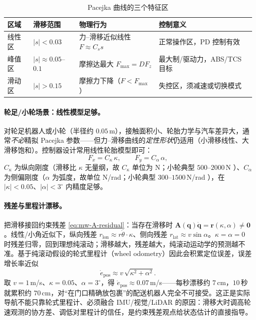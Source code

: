 \begin{table}[H]\centering\small
\caption{Pacejka 曲线的三个特征区}
\begin{tabular}{llll}
\toprule
区域 & 滑移范围 & 物理行为 & 控制意义 \\
\midrule
线性区 & $|s|<0.03$ & 力--滑移近似线性 $F\approx C_s s$ & 正常操作区，PD 控制有效 \\
峰值区 & $|s|\approx0.05$–$0.1$ & 摩擦达最大 $F_{\max}=DF_z$ & 最大制/驱动力，ABS/TCS 目标 \\
滑动区 & $|s|>0.15$ & 摩擦力下降（$F<F_{\max}$） & 失控区，须减速或切换模式 \\
\bottomrule
\end{tabular}
\end{table}

\paragraph{轮足/小轮场景：线性模型足够。}
对轮足机器人或小轮（半径约 $0.05$\,m），接触面积小、轮胎力学与汽车差异大，通常\emph{不必}精拟 Pacejka 参数——但力--滑移曲线的\emph{定性形状}仍适用（小滑移线性、大滑移饱和）。控制器设计常用线性轮胎模型即可：
\begin{equation}
  F_x=C_\kappa\,\kappa,\qquad F_y=C_\alpha\,\alpha,
  \label{eq:mw-linear-tire}
\end{equation}
$C_\kappa$ 为纵向刚度（滑移比 $\kappa$ 无量纲，故 $C_\kappa$ 单位为 N；小轮典型 $500$–$2000$\,N ）、$C_\alpha$ 为侧偏刚度（$\alpha$ 为弧度，故单位 N/rad；小轮典型 $300$–$1500$\,N/rad ），在 $|\kappa|<0.05$、$|\alpha|<3^\circ$ 内精度足够。

\paragraph{残差与里程计漂移。}
把滑移接回约束残差 \cref{eq:mw-A-residual}：当存在滑移时 $\mathbf{A}(\mathbf{q})\dot{\mathbf{q}}=\mathbf{r}(\kappa,\alpha)\neq\mathbf{0}$。线性/小角近似下，纵向残差 $r_{\text{lon}}\approx r\dot\theta\cdot\kappa$、侧向残差 $r_{\text{lat}}\approx v\sin\alpha$。$\kappa=\alpha=0$ 时残差归零，回到理想纯滚动；滑移越大，残差越大，纯滚动运动学的预测越不准。基于纯滚动假设的轮式里程计（wheel odometry）因此会积累定位误差，误差增长率近似
\begin{equation}
  \dot{e}_{\text{pos}}\approx v\,\sqrt{\kappa^2+\alpha^2}.
  \label{eq:mw-odom-drift}
\end{equation}
取 $v=1$\,m/s、$\kappa=0.05$、$\alpha=3^\circ$，得 $\dot{e}_{\text{pos}}\approx0.07$\,m/s——每秒漂移约 $7$\,cm，$10$\,秒就累积约 $70$\,cm，对“在门口精确放包裹”的配送机器人完全不可接受。这正是实际导航不能只靠轮式里程计、必须融合 IMU/视觉/LiDAR 的原因：滑移大时调高轮速观测的协方差、调低对里程计的信任，是约束残差观点给状态估计的直接指导。

